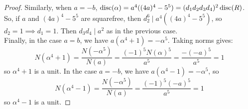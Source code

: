 \begin{proof}
    Similarly, when $a=-b$, $\operatorname{disc}(\alpha) = a^4((4a)^4-5^5) = (d_1d_2d_3d_4)^2\operatorname{disc}(R)$. So, if $a$ and $(4a)^4-5^5$ are squarefree, then $d_2^6 \mid a^4((4a)^4-5^5)$, so $d_2 = 1 \implies d_1=1$. Then $d_3d_4 \mid a^2$ as in the previous case. \\

    Finally, in the case $a=b$, we have $a(\alpha^4+1) = -\alpha^5$. Taking norms gives:
    \[ N(\alpha^4+1) = \frac{N(-\alpha^5)}{N(a)} = \frac{(-1)^5N(\alpha)^5}{a^5} = \frac{-(-a)^5}{a^5} = 1 \]
    so $\alpha^4+1$ is a unit. In the case $a=-b$, we have $a(\alpha^4-1) = -\alpha^5$, so
    \[ N(\alpha^4-1) = \frac{N(-\alpha^5)}{N(a)} = \frac{(-1)^5(-a)^5}{a^5} = 1 \]
    so $\alpha^4-1$ is a unit.
\end{proof}
